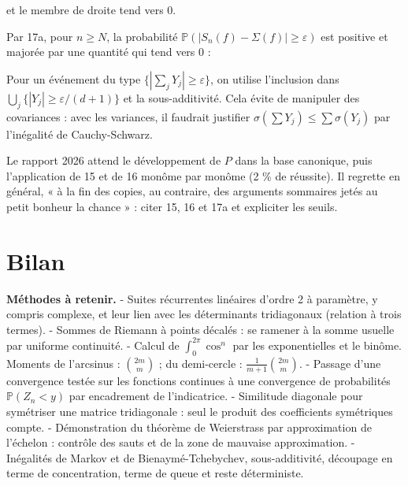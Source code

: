 \documentclass[11pt,a4paper]{article}
\newcommand{\equationajustee}[1]{%
  \sbox{\boiteequation}{$\displaystyle #1$}%
  \ifdim\wd\boiteequation>\linewidth
    \[\resizebox{\linewidth}{!}{\usebox{\boiteequation}}\]%
  \else
    \[#1\]%
  \fi}
\begin{document}
\equationajustee{\begin{aligned}{}&\mathbb P\big(|S_n(P\mathbf 1_{|x|>B})|\ge\tfrac\varepsilon4\big)\\
&\le\sum_{j=0}^d\mathbb P\big(S_n(g_{j,B})\ge\varepsilon'\big),
\end{aligned}}

et le membre de droite tend vers \(0\).

Par 17a, pour \(n\ge N\), la probabilité \(\mathbb P(|S_n(f)-\Sigma(f)|\ge\varepsilon)\) est positive et majorée par une quantité qui tend vers \(0\) :

\equationajustee{\boxed{\lim_{n\to+\infty}\mathbb P\big(|S_n(f)-\Sigma(f)|\ge\varepsilon\big)=0.}}

\begin{methode}

Pour un événement du type \(\{|\sum_jY_j|\ge\varepsilon\}\), on utilise l'inclusion dans \(\bigcup_j\{|Y_j|\ge\varepsilon/(d+1)\}\) et la sous-additivité. Cela évite de manipuler des covariances : avec les variances, il faudrait justifier \(\sigma(\sum Y_j)\le\sum\sigma(Y_j)\) par l'inégalité de Cauchy-Schwarz.

\end{methode}

\begin{jury}

Le rapport 2026 attend le développement de \(P\) dans la base canonique, puis l'application de 15 et de 16 monôme par monôme (2 \% de réussite). Il regrette en général, « à la fin des copies, au contraire, des arguments sommaires jetés au petit bonheur la chance » : citer 15, 16 et 17a et expliciter les seuils.

\end{jury}

\hypertarget{bilan}{%
\section{Bilan}\label{bilan}}

\textbf{Méthodes à retenir.}
- Suites récurrentes linéaires d'ordre 2 à paramètre, y compris complexe, et leur lien avec les déterminants tridiagonaux (relation à trois termes).
- Sommes de Riemann à points décalés : se ramener à la somme usuelle par uniforme continuité.
- Calcul de \(\int_0^{2\pi}\cos^n\) par les exponentielles et le binôme. Moments de l'arcsinus : \(\binom{2m}m\) ; du demi-cercle : \(\frac1{m+1}\binom{2m}m\).
- Passage d'une convergence testée sur les fonctions continues à une convergence de probabilités \(\mathbb P(Z_n<y)\) par encadrement de l'indicatrice.
- Similitude diagonale pour symétriser une matrice tridiagonale : seul le produit des coefficients symétriques compte.
- Démonstration du théorème de Weierstrass par approximation de l'échelon : contrôle des sauts et de la zone de mauvaise approximation.
- Inégalités de Markov et de Bienaymé-Tchebychev, sous-additivité, découpage en terme de concentration, terme de queue et reste déterministe.
\end{document}
